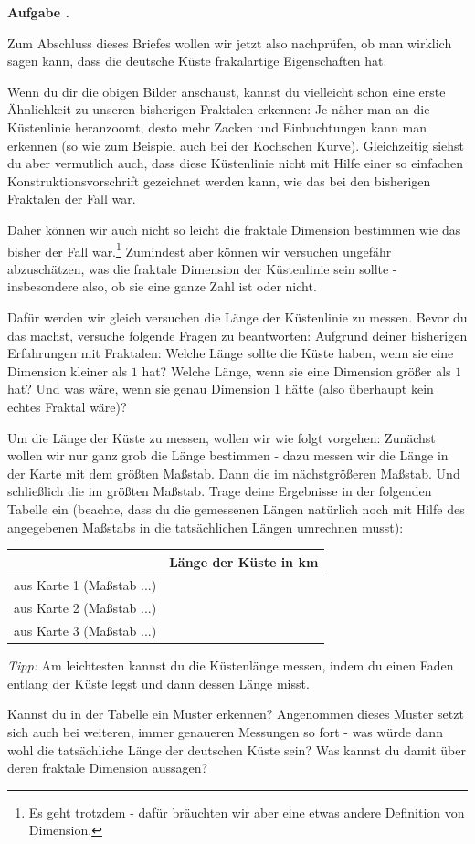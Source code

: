 \documentclass[a4paper,ngerman,12pt]{scrartcl}
\theoremstyle{definition}
\theoremstyle{plain}
\theoremstyle{remark}
\newlength{\aufgabenskip}
\newcounter{aufgabennummer}
\newenvironment{aufgabe}[1]{
  \addtocounter{aufgabennummer}{1}
  \textbf{Aufgabe \theaufgabennummer.} \emph{#1} \par
}{\vspace{\aufgabenskip}}
\begin{document}
\begin{aufgabe}{}
Zum Abschluss dieses Briefes wollen wir jetzt also nachprüfen, ob man wirklich sagen kann, dass die deutsche Küste \glqq frakalartige Eigenschaften\grqq{} hat. 

Wenn du dir die obigen Bilder anschaust, kannst du vielleicht schon eine erste Ähnlichkeit zu unseren bisherigen Fraktalen erkennen: Je näher man an die Küstenlinie heranzoomt, desto mehr Zacken und Einbuchtungen kann man erkennen (so wie zum Beispiel auch bei der Kochschen Kurve). Gleichzeitig siehst du aber vermutlich auch, dass diese Küstenlinie nicht mit Hilfe einer so einfachen Konstruktionsvorschrift gezeichnet werden kann, wie das bei den bisherigen Fraktalen der Fall war.

Daher können wir auch nicht so leicht die fraktale Dimension bestimmen wie das bisher der Fall war.\footnote{Es geht trotzdem - dafür bräuchten wir aber eine etwas andere Definition von Dimension.} Zumindest aber können wir versuchen ungefähr abzuschätzen, was die fraktale Dimension der Küstenlinie sein sollte - insbesondere also, ob sie eine ganze Zahl ist oder nicht.

Dafür werden wir gleich versuchen die Länge der Küstenlinie zu messen. Bevor du das machst, versuche folgende Fragen zu beantworten: Aufgrund deiner bisherigen Erfahrungen mit Fraktalen: Welche Länge sollte die Küste haben, wenn sie eine Dimension kleiner als $1$ hat? Welche Länge, wenn sie eine Dimension größer als $1$ hat? Und was wäre, wenn sie genau Dimension $1$ hätte (also überhaupt kein echtes Fraktal wäre)?

Um die Länge der Küste zu messen, wollen wir wie folgt vorgehen: Zunächst wollen wir nur ganz grob die Länge bestimmen - dazu messen wir die Länge in der Karte mit dem größten Maßstab. Dann die im nächstgrößeren Maßstab. Und schließlich die im größten Maßstab. Trage deine Ergebnisse in der folgenden Tabelle ein (beachte, dass du die gemessenen Längen natürlich noch mit Hilfe des angegebenen Maßstabs in die tatsächlichen Längen umrechnen musst):

\begin{center}
	\renewcommand{\arraystretch}{2}
	\begin{tabular}{l||c}
		& Länge der Küste in \unit{km} \\\hline\hline
		aus Karte 1 (Maßstab ...) & \\\hline
		aus Karte 2 (Maßstab ...) & \\\hline
		aus Karte 3 (Maßstab ...) &
	\end{tabular}
\end{center}


\emph{Tipp:} Am leichtesten kannst du die Küstenlänge messen, indem du einen Faden entlang der Küste legst und dann dessen Länge misst.

Kannst du in der Tabelle ein Muster erkennen? Angenommen dieses Muster setzt sich auch bei weiteren, immer genaueren Messungen so fort - was würde dann wohl die tatsächliche Länge der deutschen Küste sein? Was kannst du damit über deren fraktale Dimension aussagen?
\end{aufgabe}
\end{document}
